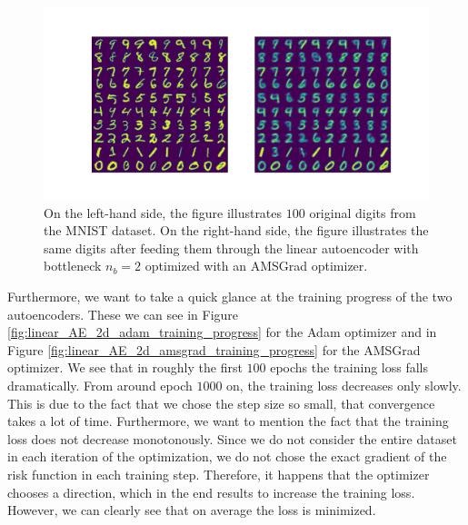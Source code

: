 \begin{figure}
\begin{center}
   \begin{minipage}[b]{\linewidth}
      \includegraphics[trim = 15mm 10mm 15mm 15mm, clip, width=\linewidth]{linear_AE_2d_amsgrad_inference}
	\end{minipage}
\end{center}
\caption{On the left-hand side, the figure illustrates $100$ original digits from the MNIST dataset. On the right-hand side, the figure illustrates the same digits after feeding them through the linear autoencoder with bottleneck $n_b=2$ optimized with an AMSGrad optimizer.}\label{fig:linear_AE_2d_amsgrad_inference}
\end{figure}


Furthermore, we want to take a quick glance at the training progress of the two autoencoders. These we can see in Figure \ref{fig:linear_AE_2d_adam_training_progress} for the Adam optimizer and in Figure \ref{fig:linear_AE_2d_amsgrad_training_progress} for the AMSGrad optimizer. We see that in roughly the first $100$ epochs the training loss falls dramatically. From around epoch $1000$ on, the training loss decreases only slowly. This is due to the fact that we chose the step size so small, that convergence takes a lot of time. Furthermore, we want to mention the fact that the training loss does not decrease monotonously. Since we do not consider the entire dataset in each iteration of the optimization, we do not chose the exact gradient of the risk function in each training step. Therefore, it happens that the optimizer chooses a direction, which in the end results to increase the training loss. However, we can clearly see that on average the loss is minimized.


